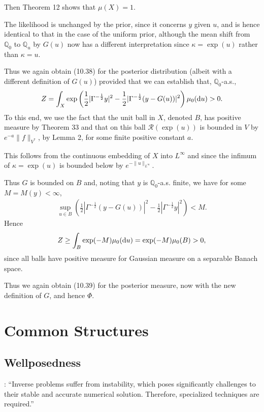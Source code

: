 \documentclass[oneside,11pt]{book}
\numberwithin{equation}{section}
\begin{document}
Then Theorem 12 shows that $\mu(X) = 1$.

The likelihood is unchanged by the prior, since it concerns $y$ given $u$, and is hence identical to that in the case of the uniform prior, although the mean shift from $\mathbb{Q}_0$ to $\mathbb{Q}_u$ by $G(u)$ now has a different interpretation since $\kappa = \exp(u)$ rather than $\kappa = u$.

Thus we again obtain (10.38) for the posterior distribution (albeit with a different definition of $G(u)$) provided that we can establish that, $\mathbb{Q}_0$-a.s.,
\begin{align*}
    Z = \int_X \exp\left(\frac{1}{2}|\Gamma^{-\frac{1}{2}}y|^2 - \frac{1}{2}|\Gamma^{-\frac{1}{2}}(y - G(u))|^2\right)\mu_0({\rm d}u) > 0.
\end{align*}
To this end, we use the fact that the unit ball in $X$, denoted $B$, has positive measure by Theorem 33 and that on this ball $\mathcal{R}(\exp(u))$ is bounded in $V$ by $e^{-a}\|f\|_{V^*}$, by Lemma 2, for some finite positive constant $a$.

This follows from the continuous embedding of $X$ into $L^\infty$ and since the infimum of $\kappa = \exp(u)$ is bounded below by $e^{-\|u\|_{L^\infty}}$.

Thus $G$ is bounded on $B$ and, noting that $y$ is $\mathbb{Q}_0$-a.s. finite, we have for some $M = M(y) < \infty$,
\begin{align*}
    \sup_{u\in B} \left(\frac{1}{2}|\Gamma^{-\frac{1}{2}}(y - G(u))|^2 - \frac{1}{2}|\Gamma^{-\frac{1}{2}}y|^2\right) < M.
\end{align*}
Hence
\begin{align*}
    Z\ge\int_B \exp(-M)\mu_0({\rm d}u) = \exp(-M)\mu_0(B) > 0,
\end{align*}
since all balls have positive measure for Gaussian measure on a separable Banach space.

Thus we again obtain (10.39) for the posterior measure, now with the new definition of $G$, and hence $\Phi$.


\chapter{Common Structures}

\section{Wellposedness}
\cite[Chap. 3]{Ito_Jin2015}: ``Inverse problems suffer from instability, which poses significantly challenges to their stable and accurate numerical solution.
Therefore, specialized techniques are required.''
\end{document}
